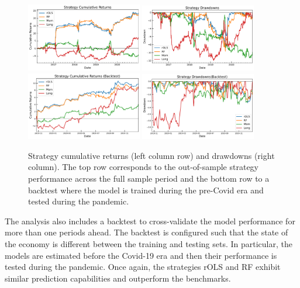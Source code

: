 \documentclass[12pt]{article}
\begin{document}
\begin{figure}[htbp]
\centering
\includegraphics[width=0.45\textwidth]{cumret}
\includegraphics[width=0.45\textwidth]{drawdowns} \\
\includegraphics[width=0.45\textwidth]{cumret_backtest}
\includegraphics[width=0.45\textwidth]{drawdowns_backtest}
\caption{Strategy cumulative returns (left column row) and drawdowns (right column). The top row corresponds to the out-of-sample strategy performance across the full sample period and the bottom row to a backtest where the model is trained during the pre-Covid era and tested during the pandemic.}
\label{fig:performance}
\end{figure}

The analysis also includes a backtest to cross-validate the model performance for more than one periods ahead. The backtest is configured such that the state of the economy is different between the training and testing sets. In particular, the models are estimated before the Covid-19 era and then their performance is tested during the pandemic. Once again, the strategies rOLS and RF exhibit similar prediction capabilities and outperform the benchmarks.
\end{document}
